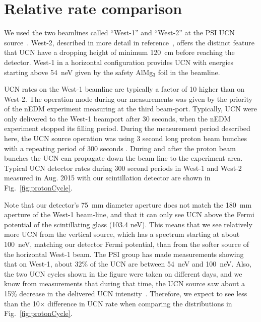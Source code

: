 \documentclass[twocolumn]{bmcart}
\begin{document}
\section{ Relative rate comparison }\label{sec:relative}

We used the two beamlines called ``West-1'' and ``West-2'' at the PSI
UCN source~\cite{ucnBeam}.  West-2, described in more detail in
reference~\cite{ucnBeam}, offers the distinct feature that UCN have a
dropping height of minimum 120~cm before reaching the detector.
West-1 in a horizontal configuration provides UCN with energies
starting above 54~neV given by the safety AlMg$_3$ foil in the
beamline.  

UCN rates on the West-1 beamline are typically a factor of 10 higher
than on West-2.  The operation mode during our measurements was given
by the priority of the nEDM experiment measuring at the third
beam-port.  Typically, UCN were only delivered to the West-1 beamport
after 30 seconds, when the nEDM experiment stopped its filling period.
During the measurement period described here, the UCN source operation
was using 3 second long proton beam bunches with a repeating period of
300 seconds .  During and after the proton beam bunches the UCN can
propagate down the beam line to the experiment area.  Typical UCN
detector rates during 300 second periods in West-1 and West-2 measured
in Aug. 2015 with our scintillation detector are shown in
Fig.~\ref{fig:protonCycle}.

Note that our detector's 75~mm diameter aperture does not match the
180~mm aperture of the West-1 beam-line, and that it can only see UCN
above the Fermi potential of the scintillating glass (103.4 neV).
This means that we see relatively more UCN from the vertical source,
which has a spectrum starting at about 100~neV, matching our detector
Fermi potential, than from the softer source of the horizontal West-1
beam.  The PSI group has made measurements showing that on West-1,
about 32\% of the UCN are between 54~neV and 100~neV.  Also, the two
UCN cycles shown in the figure were taken on different days, and we
know from measurements that during that time, the UCN source saw about
a 15\% decrease in the delivered UCN intensity~\cite{DRies}.
Therefore, we expect to see less than the 10$\times$ difference in UCN
rate when comparing the distributions in Fig.~\ref{fig:protonCycle}.
\end{document}

